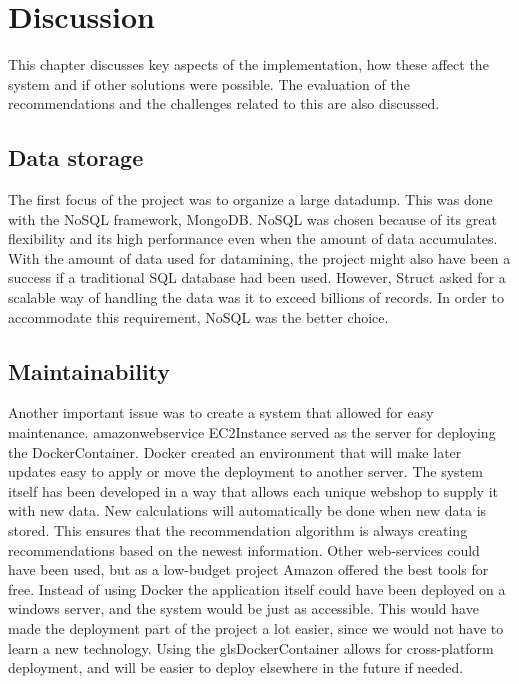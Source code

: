 
\chapter{Discussion} %

\label{Discussion} %

This chapter discusses key aspects of the implementation, how these affect the system and if other solutions were possible. The evaluation of the recommendations and the challenges related to this are also discussed.

\section{Data storage}
The first focus of the project was to organize a large datadump. This was done with the \gls{NoSQL} framework, \gls{MongoDB}. \gls{NoSQL} was chosen because of its great flexibility and its high performance even when the amount of data accumulates. With the amount of data used for \gls{datamining}, the project might also have been a success if a traditional SQL database had been used. However, \gls{Struct} asked for a scalable way of handling the data was it to exceed billions of records. In order to accommodate this requirement, \gls{NoSQL} was the better choice.

\section{Maintainability}
Another important issue was to create a system that allowed for easy maintenance. \gls{amazonwebservice} \gls{EC2Instance} served as the server for deploying the \gls{DockerContainer}. \gls{Docker} created an environment that will make later updates easy to apply or move the deployment to another server. The system itself has been developed in a way that allows each unique webshop to supply it with new data. New calculations will automatically be done when new data is stored. This ensures that the recommendation algorithm is always creating recommendations based on the newest information. Other web-services could have been used, but as a low-budget project \gls{Amazon} offered the best tools for free.
Instead of using \gls{Docker} the application itself could have been deployed on a windows server, and the system would be just as accessible. This would have made the deployment part of the project a lot easier, since we would not have to learn a new technology. Using the gls{DockerContainer} allows for cross-platform deployment, and will be easier to deploy elsewhere in the future if needed.

